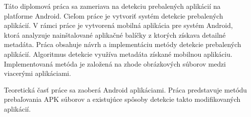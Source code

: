 Táto diplomová práca sa zameriava na detekciu prebalených aplikácií na platforme Android. Cieľom práce je vytvoriť systém detekcie prebalených aplikácií. V rámci práce je vytvorená mobilná aplikácia pre systém Android, ktorá analyzuje nainštalované aplikačné balíčky z ktorých získava detailné metadáta. 
Práca obsahuje návrh a implementáciu metódy detekcie prebalených aplikácií. Algoritmus detekcie využíva metadáta získané mobilnou aplikáciu. Implementovaná metóda je založená na zhode obrázkových súborov medzi viacerými aplikáciami. 

\noindent Teoretická časť práce sa zaoberá Android aplikáciami. Práca predstavuje metódu prebaľovania APK súborov a existujúce spôsoby detekcie takto modifikovaných aplikácií.




